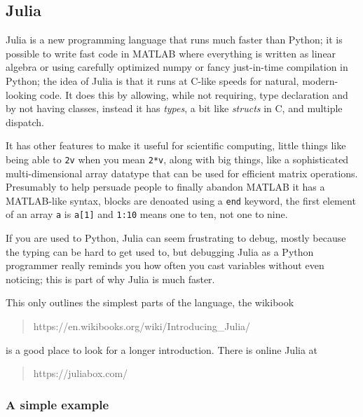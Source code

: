 \documentclass[11pt,a4paper]{scrartcl}
\begin{document}
\subsection*{Julia}

Julia is a new programming language that runs much faster than Python;
it is possible to write fast code in MATLAB where everything is
written as linear algebra or using carefully optimized numpy or fancy
just-in-time compilation in Python; the idea of Julia is that it runs
at C-like speeds for natural, modern-looking code. It does this by
allowing, while not requiring, type declaration and by not having
classes, instead it has \textsl{types}, a bit like \textsl{structs} in
C, and multiple dispatch. 

It has other features to make it useful for scientific computing,
little things like being able to \texttt{2v} when you mean
\texttt{2*v}, along with big things, like a sophisticated
multi-dimensional array datatype that can be used for efficient matrix
operations. Presumably to help persuade people to finally abandon
MATLAB it has a MATLAB-like syntax, blocks are denoated using a
\texttt{end} keyword, the first element of an array \texttt{a} is
\texttt{a[1]} and \texttt{1:10} means one to ten, not one to nine.

If you are used to Python, Julia can seem frustrating to debug, mostly
because the typing can be hard to get used to, but debugging Julia as
a Python programmer really reminds you how often you cast variables
without even noticing; this is part of why Julia is much faster.

This only outlines the simplest parts of the language, the wikibook
\begin{quote}
https://en.wikibooks.org/wiki/Introducing\_Julia/
\end{quote}
is a good place to look for a longer introduction. There is online Julia at
\begin{quote}
https://juliabox.com/
\end{quote}

\subsubsection*{A simple example}
\end{document}
